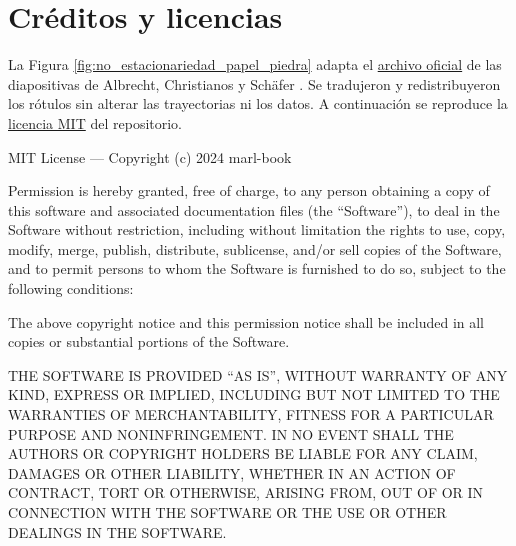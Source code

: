 \section{Créditos y licencias}\label{sec:creditos_licencias}

La Figura \ref{fig:no_estacionariedad_papel_piedra} adapta el \href{https://github.com/marl-book/slides/blob/b3ca17ba/source/images/chapter6/wolfphc_rps_own.pdf}{archivo oficial} de las diapositivas de Albrecht, Christianos y Schäfer \cite{marlbook}. Se tradujeron y redistribuyeron los rótulos sin alterar las trayectorias ni los datos. A continuación se reproduce la \href{https://github.com/marl-book/slides/blob/b3ca17ba/LICENSE}{licencia MIT} del repositorio.

{\small{}
\noindent MIT License --- Copyright (c) 2024 marl-book\par

\noindent Permission is hereby granted, free of charge, to any person obtaining a copy of this software and associated documentation files (the ``Software''), to deal in the Software without restriction, including without limitation the rights to use, copy, modify, merge, publish, distribute, sublicense, and/or sell copies of the Software, and to permit persons to whom the Software is furnished to do so, subject to the following conditions:\par

\noindent The above copyright notice and this permission notice shall be included in all copies or substantial portions of the Software.\par

\noindent THE SOFTWARE IS PROVIDED ``AS IS'', WITHOUT WARRANTY OF ANY KIND, EXPRESS OR IMPLIED, INCLUDING BUT NOT LIMITED TO THE WARRANTIES OF MERCHANTABILITY, FITNESS FOR A PARTICULAR PURPOSE AND NONINFRINGEMENT. IN NO EVENT SHALL THE AUTHORS OR COPYRIGHT HOLDERS BE LIABLE FOR ANY CLAIM, DAMAGES OR OTHER LIABILITY, WHETHER IN AN ACTION OF CONTRACT, TORT OR OTHERWISE, ARISING FROM, OUT OF OR IN CONNECTION WITH THE SOFTWARE OR THE USE OR OTHER DEALINGS IN THE SOFTWARE.\par}
